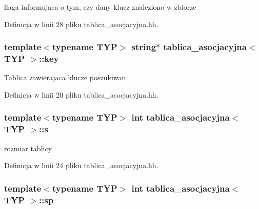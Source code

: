 flaga informujaca o tym, czy dany klucz znaleziono w zbiorze 



\-Definicja w linii 28 pliku tablica\-\_\-asocjacyjna.\-hh.

\hypertarget{classtablica__asocjacyjna_aefde9ad3347d42f36cab258144bacc1f}{
\subsubsection[{key}]{\setlength{\rightskip}{0pt plus 5cm}template$<$typename \-T\-Y\-P$>$ string$\ast$ {\bf tablica\-\_\-asocjacyjna}$<$ \-T\-Y\-P $>$\-::{\bf key}}}\label{classtablica__asocjacyjna_aefde9ad3347d42f36cab258144bacc1f}


\-Tablica zawierajaca klucze poszukiwan. 



\-Definicja w linii 20 pliku tablica\-\_\-asocjacyjna.\-hh.

\hypertarget{classtablica__asocjacyjna_a4a9d8aa0a03fd1ccf2fa7980d61bc197}{
\subsubsection[{s}]{\setlength{\rightskip}{0pt plus 5cm}template$<$typename \-T\-Y\-P$>$ int {\bf tablica\-\_\-asocjacyjna}$<$ \-T\-Y\-P $>$\-::{\bf s}}}\label{classtablica__asocjacyjna_a4a9d8aa0a03fd1ccf2fa7980d61bc197}


rozmiar tablicy 



\-Definicja w linii 24 pliku tablica\-\_\-asocjacyjna.\-hh.

\hypertarget{classtablica__asocjacyjna_a2af0a8be0f335f5ad09f908cb08c0039}{
\subsubsection[{sp}]{\setlength{\rightskip}{0pt plus 5cm}template$<$typename \-T\-Y\-P$>$ int {\bf tablica\-\_\-asocjacyjna}$<$ \-T\-Y\-P $>$\-::{\bf sp}}}\label{classtablica__asocjacyjna_a2af0a8be0f335f5ad09f908cb08c0039}


